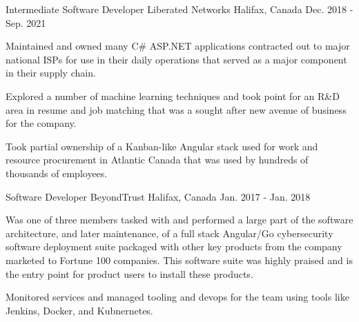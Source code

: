 
\begin{cventries}

  \cventry
    {Intermediate Software Developer} %
    {Liberated Networks} %
    {Halifax, Canada} %
    {Dec. 2018 - Sep. 2021} %
    {
      \begin{cvitems}
        \item {Maintained and owned many C\# ASP.NET applications contracted out to major national ISPs for use in their daily operations that served as a major component in their supply chain.}
        \item {Explored a number of machine learning techniques and took point for an R\&D area in resume and job matching that was a sought after new avenue of business for the company.}
        \item {Took partial ownership of a Kanban-like Angular stack used for work and resource procurement in Atlantic Canada that was used by hundreds of thousands of employees.}
      \end{cvitems}
    }

  \cventry
    {Software Developer} %
    {BeyondTrust} %
    {Halifax, Canada} %
    {Jan. 2017 - Jan. 2018} %
    {
      \begin{cvitems}
        \item {Was one of three members tasked with and performed a large part of the software architecture, and later maintenance, of a full stack Angular/Go cybersecurity software deployment suite packaged with other key products from the company marketed to Fortune 100 companies. This software suite was highly praised and is the entry point for product users to install these products.}
        \item {Monitored services and managed tooling and devops for the team using tools like Jenkins, Docker, and Kubnernetes.}
      \end{cvitems}
    }


\end{cventries}
